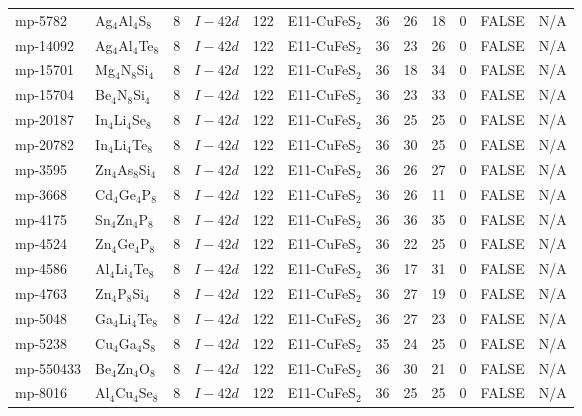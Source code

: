 {\begin{longtable}{llcccccccccc}
    mp-5782 & Ag$_{4}$Al$_{4}$S$_{8}$ & 8     & $I-42d$ & 122   & E11-CuFeS$_{2}$ & 36    & 26    & 18    & 0     & FALSE & N/A \\
    mp-14092 & Ag$_{4}$Al$_{4}$Te$_{8}$ & 8     & $I-42d$ & 122   & E11-CuFeS$_{2}$ & 36    & 23    & 26    & 0     & FALSE & N/A \\
    mp-15701 & Mg$_{4}$N$_{8}$Si$_{4}$ & 8     & $I-42d$ & 122   & E11-CuFeS$_{2}$ & 36    & 18    & 34    & 0     & FALSE & N/A \\
    mp-15704 & Be$_{4}$N$_{8}$Si$_{4}$ & 8     & $I-42d$ & 122   & E11-CuFeS$_{2}$ & 36    & 23    & 33    & 0     & FALSE & N/A \\
    mp-20187 & In$_{4}$Li$_{4}$Se$_{8}$ & 8     & $I-42d$ & 122   & E11-CuFeS$_{2}$ & 36    & 25    & 25    & 0     & FALSE & N/A \\
    mp-20782 & In$_{4}$Li$_{4}$Te$_{8}$ & 8     & $I-42d$ & 122   & E11-CuFeS$_{2}$ & 36    & 30    & 25    & 0     & FALSE & N/A \\
    mp-3595 & Zn$_{4}$As$_{8}$Si$_{4}$ & 8     & $I-42d$ & 122   & E11-CuFeS$_{2}$ & 36    & 26    & 27    & 0     & FALSE & N/A \\
    mp-3668 & Cd$_{4}$Ge$_{4}$P$_{8}$ & 8     & $I-42d$ & 122   & E11-CuFeS$_{2}$ & 36    & 26    & 11    & 0     & FALSE & N/A \\
    mp-4175 & Sn$_{4}$Zn$_{4}$P$_{8}$ & 8     & $I-42d$ & 122   & E11-CuFeS$_{2}$ & 36    & 36    & 35    & 0     & FALSE & N/A \\
    mp-4524 & Zn$_{4}$Ge$_{4}$P$_{8}$ & 8     & $I-42d$ & 122   & E11-CuFeS$_{2}$ & 36    & 22    & 25    & 0     & FALSE & N/A \\
    mp-4586 & Al$_{4}$Li$_{4}$Te$_{8}$ & 8     & $I-42d$ & 122   & E11-CuFeS$_{2}$ & 36    & 17    & 31    & 0     & FALSE & N/A \\
    mp-4763 & Zn$_{4}$P$_{8}$Si$_{4}$ & 8     & $I-42d$ & 122   & E11-CuFeS$_{2}$ & 36    & 27    & 19    & 0     & FALSE & N/A \\
    mp-5048 & Ga$_{4}$Li$_{4}$Te$_{8}$ & 8     & $I-42d$ & 122   & E11-CuFeS$_{2}$ & 36    & 27    & 23    & 0     & FALSE & N/A \\
    mp-5238 & Cu$_{4}$Ga$_{4}$S$_{8}$ & 8     & $I-42d$ & 122   & E11-CuFeS$_{2}$ & 35    & 24    & 25    & 0     & FALSE & N/A \\
    mp-550433 & Be$_{4}$Zn$_{4}$O$_{8}$ & 8     & $I-42d$ & 122   & E11-CuFeS$_{2}$ & 36    & 30    & 21    & 0     & FALSE & N/A \\
    mp-8016 & Al$_{4}$Cu$_{4}$Se$_{8}$ & 8     & $I-42d$ & 122   & E11-CuFeS$_{2}$ & 36    & 25    & 25    & 0     & FALSE & N/A \\

\end{longtable}}
